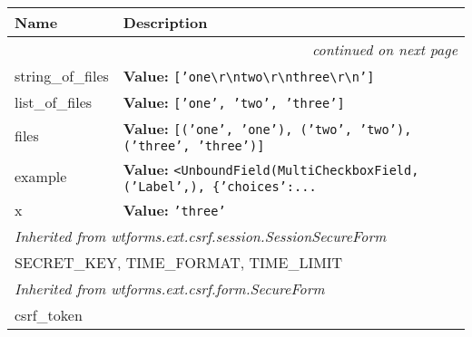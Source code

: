     \vspace{-1cm}
\hspace{\varindent}\begin{longtable}{|p{\varnamewidth}|p{\vardescrwidth}|l}
\cline{1-2}
\cline{1-2} \centering \textbf{Name} & \centering \textbf{Description}& \\
\cline{1-2}
\endhead\cline{1-2}\multicolumn{3}{r}{\small\textit{continued on next page}}\\\endfoot\cline{1-2}
\endlastfoot\raggedright s\-t\-r\-i\-n\-g\-\_\-o\-f\-\_\-f\-i\-l\-e\-s\- & \raggedright \textbf{Value:} 
{\tt \texttt{[}\texttt{'}\texttt{one{\textbackslash}r{\textbackslash}ntwo{\textbackslash}r{\textbackslash}nthree{\textbackslash}r{\textbackslash}n}\texttt{'}\texttt{]}}&\\
\cline{1-2}
\raggedright l\-i\-s\-t\-\_\-o\-f\-\_\-f\-i\-l\-e\-s\- & \raggedright \textbf{Value:} 
{\tt \texttt{[}\texttt{'}\texttt{one}\texttt{'}\texttt{, }\texttt{'}\texttt{two}\texttt{'}\texttt{, }\texttt{'}\texttt{three}\texttt{'}\texttt{]}}&\\
\cline{1-2}
\raggedright f\-i\-l\-e\-s\- & \raggedright \textbf{Value:} 
{\tt \texttt{[}\texttt{(}\texttt{'}\texttt{one}\texttt{'}\texttt{, }\texttt{'}\texttt{one}\texttt{'}\texttt{)}\texttt{, }\texttt{(}\texttt{'}\texttt{two}\texttt{'}\texttt{, }\texttt{'}\texttt{two}\texttt{'}\texttt{)}\texttt{, }\texttt{(}\texttt{'}\texttt{three}\texttt{'}\texttt{, }\texttt{'}\texttt{three}\texttt{'}\texttt{)}\texttt{]}}&\\
\cline{1-2}
\raggedright e\-x\-a\-m\-p\-l\-e\- & \raggedright \textbf{Value:} 
{\tt {\textless}UnboundField(MultiCheckboxField, ('Label',), \{'choices':\texttt{...}}&\\
\cline{1-2}
\raggedright x\- & \raggedright \textbf{Value:} 
{\tt \texttt{'}\texttt{three}\texttt{'}}&\\
\cline{1-2}
\multicolumn{2}{|l|}{\textit{Inherited from wtforms.ext.csrf.session.SessionSecureForm}}\\
\multicolumn{2}{|p{\varwidth}|}{\raggedright SECRET\_KEY, TIME\_FORMAT, TIME\_LIMIT}\\
\cline{1-2}
\multicolumn{2}{|l|}{\textit{Inherited from wtforms.ext.csrf.form.SecureForm}}\\
\multicolumn{2}{|p{\varwidth}|}{\raggedright csrf\_token}\\
\cline{1-2}
\end{longtable}


